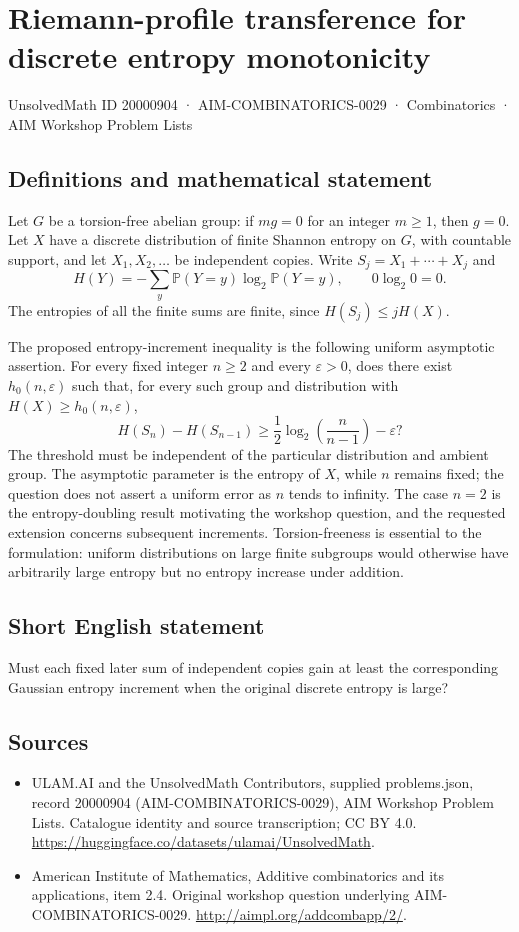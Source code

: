 \documentclass[11pt,a4paper]{article}
\begin{document}
\section*{Riemann-profile transference for discrete entropy monotonicity}\label{20000904}
{\small UnsolvedMath ID 20000904 · AIM-COMBINATORICS-0029 · Combinatorics · AIM Workshop Problem Lists}
\subsection{Definitions and mathematical statement}
Let $G$ be a torsion-free abelian group: if $mg=0$ for an integer $m\geq1$, then $g=0$.
Let $X$ have a discrete distribution of finite Shannon entropy on $G$, with countable support, and let $X_1,X_2,\ldots$ be independent copies.
Write $S_j=X_1+\cdots+X_j$ and
\[
 H(Y)=-\sum_y\mathbb P(Y=y)\log_2\mathbb P(Y=y),
 \qquad 0\log_2 0=0.
\]
The entropies of all the finite sums are finite, since $H(S_j)\leq jH(X)$.

The proposed entropy-increment inequality is the following uniform asymptotic assertion.
For every fixed integer $n\geq2$ and every $\varepsilon>0$, does there exist $h_0(n,\varepsilon)$ such that, for every such group and distribution with $H(X)\geq h_0(n,\varepsilon)$,
\[
 H(S_n)-H(S_{n-1})
 \geq\frac12\log_2\!\left(\frac n{n-1}\right)-\varepsilon?
\]
The threshold must be independent of the particular distribution and ambient group.
The asymptotic parameter is the entropy of $X$, while $n$ remains fixed; the question does not assert a uniform error as $n$ tends to infinity.
The case $n=2$ is the entropy-doubling result motivating the workshop question, and the requested extension concerns subsequent increments.
Torsion-freeness is essential to the formulation: uniform distributions on large finite subgroups would otherwise have arbitrarily large entropy but no entropy increase under addition.
\subsection{Short English statement}
Must each fixed later sum of independent copies gain at least the corresponding Gaussian entropy increment when the original discrete entropy is large?
\subsection{Sources}
\begin{itemize}
\item[S1] ULAM.AI and the UnsolvedMath Contributors, supplied problems.json, record 20000904 (AIM-COMBINATORICS-0029), AIM Workshop Problem Lists. Catalogue identity and source transcription; CC BY 4.0.
\url{https://huggingface.co/datasets/ulamai/UnsolvedMath}.
\item[S2] American Institute of Mathematics, Additive combinatorics and its applications, item 2.4. Original workshop question underlying AIM-COMBINATORICS-0029.
\url{http://aimpl.org/addcombapp/2/}.
\end{itemize}
\end{document}
